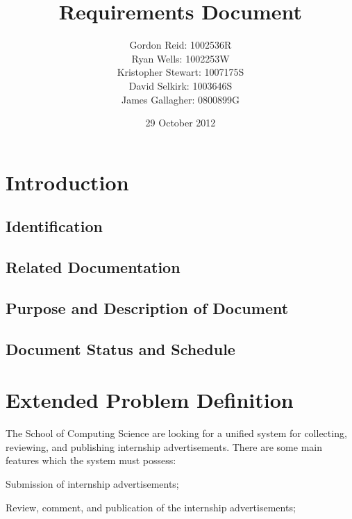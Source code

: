 \documentclass{l3deliverable}
\title{Requirements Document}
\author{
    Gordon Reid: 1002536R\\
    Ryan Wells: 1002253W\\
    Kristopher Stewart: 1007175S\\
    David Selkirk: 1003646S\\
    James Gallagher: 0800899G\\
}
\date{29 October 2012}
\begin{document}

\maketitle

\tableofcontents

\newpage


\section{Introduction}

\subsection{Identification}

\subsection{Related Documentation}

\subsection{Purpose and Description of Document}

\subsection{Document Status and Schedule}


\section{Extended Problem Definition}


The School of Computing Science are looking for a unified system for 
collecting, reviewing, and publishing internship advertisements. There are 
some main features which the system must possess: 

Submission of internship advertisements;

Review, comment, and publication of the internship advertisements;
\end{document}
